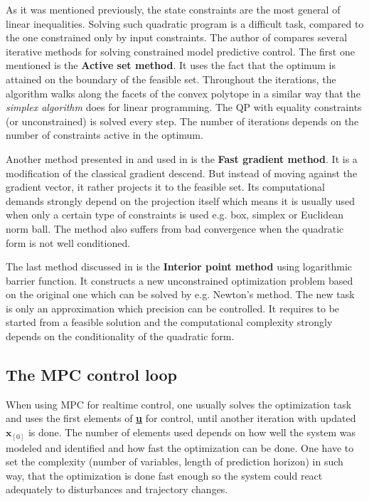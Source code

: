 As it was mentioned previously, the state constraints are the most general of linear inequalities. Solving such quadratic program is a difficult task, compared to the one constrained only by input constraints. The author of \citep{mikulas2013} compares several iterative methods for solving constrained model predictive control. The first one mentioned is the \textbf{Active set method}. It uses the fact that the optimum is attained on the boundary of the feasible set. Throughout the iterations, the algorithm walks along the facets of the convex polytope in a similar way that the \textit{simplex algorithm} does for linear programming. The QP with equality constraints (or unconstrained) is solved every step. The number of iterations depends on the number of constraints active in the optimum.

Another method presented in \citep{mikulas2013} and used in \citep{zometa2012segway} is the \textbf{Fast gradient method}. It is a modification of the classical gradient descend. But instead of moving against the gradient vector, it rather projects it to the feasible set. Its computational demands strongly depend on the projection itself which means it is usually used when only a certain type of constraints is used e.g. box, simplex or Euclidean norm ball. The method also suffers from bad convergence when the quadratic form is not well conditioned.

The last method discussed in \citep{mikulas2013} is the \textbf{Interior point method} using logarithmic barrier function. It constructs a new unconstrained optimization problem based on the original one which can be solved by e.g. Newton's method. The new task is only an approximation which precision can be controlled. It requires to be started from a feasible solution and the computational complexity strongly depends on the conditionality of the quadratic form.

\subsection{The MPC control loop}
\label{cap:qmpc_control_loop}

When using MPC for realtime control, one usually solves the optimization task and uses the first elements of \textbf{\underline{u}} for control, until another iteration with updated $\textbf{x}_{[0]}$ is done. The number of elements used depends on how well the system was modeled and identified and how fast the optimization can be done. One have to set the complexity (number of variables, length of prediction horizon) in such way, that the optimization is done fast enough so the system could react adequately to disturbances and trajectory changes.


